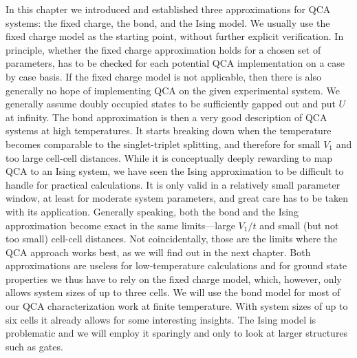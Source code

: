 In this chapter we introduced and established three approximations for QCA
systems: the fixed charge, the bond, and the Ising model. We usually use the
fixed charge model as the starting point, without further explicit verification.
In principle, whether the fixed charge approximation holds for a chosen set of
parameters, has to be checked for each potential QCA implementation on a case by
case basis. If the fixed charge model is not applicable, then there is also
generally no hope of implementing QCA on the given experimental system. We
generally assume doubly occupied states to be sufficiently gapped out and put
$U$ at infinity. The bond approximation is then a very good description of QCA
systems at high temperatures. It starts breaking down when the temperature
becomes comparable to the singlet-triplet splitting, and therefore for small
$V_1$ and too large cell-cell distances. While it is conceptually deeply
rewarding to map QCA to an Ising system, we have seen the Ising approximation to
be difficult to handle for practical calculations. It is only valid in a
relatively small parameter window, at least for moderate system parameters, and
great care has to be taken with its application. Generally speaking, both the
bond and the Ising approximation become exact in the same limits---large $V_1/t$
and small (but not too small) cell-cell distances. Not coincidentally, those are
the limits where the QCA approach works best, as we will find out in the next
chapter. Both approximations are useless for low-temperature calculations and
for ground state properties we thus have to rely on the fixed charge model,
which, however, only allows system sizes of up to three cells. We will use the
bond model for most of our QCA characterization work at finite temperature. With
system sizes of up to six cells it already allows for some interesting insights.
The Ising model is problematic and we will employ it sparingly and only to look
at larger structures such as gates.

%
%
